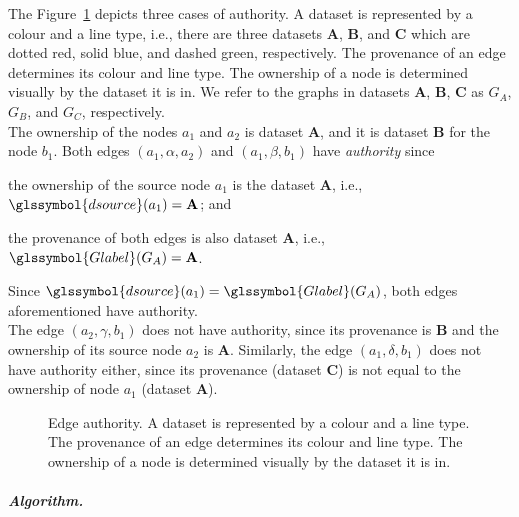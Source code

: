The Figure~\ref{fig:authority} depicts three cases of authority. A dataset is represented by a colour and a line type, i.e., there are three datasets {\bfseries A}, {\bfseries B}, and {\bfseries C} which are dotted red, solid blue, and dashed green, respectively. The provenance of an edge determines its colour and line type. The ownership of a node is determined visually by the dataset it is in. We refer to the graphs in datasets \textbf{A}, \textbf{B}, \textbf{C} as $G_A$, $G_B$, and $G_C$, respectively.\\

The ownership of the nodes $a_1$ and $a_2$ is dataset {\bfseries A}, and it is dataset {\bfseries B} for the node $b_1$. Both edges $(a_1, \alpha, a_2)$ and $\left(a_1, \beta, b_1 \right)$ have \emph{authority} since
\begin{inparaenum}[(1)]
	\item the ownership of the source node $a_1$ is the dataset {\bfseries A}, i.e., $\glssymbol{dsource}(a_1) = \textbf{A}$; and
	\item the provenance of both edges is also dataset {\bfseries A}, i.e., $\glssymbol{Glabel}(G_A) = \textbf{A}$.
\end{inparaenum}
Since $\glssymbol{dsource}(a_1) = \glssymbol{Glabel}(G_A)$, both edges aforementioned have authority.\\

The edge $\left(a_2, \gamma, b_1\right)$ does not have authority, since its provenance is {\bfseries B} and the ownership of its source node $a_2$ is {\bfseries A}. Similarly, the edge $\left(a_1,\delta,b_1\right)$ does not have authority either, since its provenance (dataset \textbf{C}) is not equal to the ownership of node $a_1$ (dataset \textbf{A}).

\begin{figure}
	\centering
	
	\caption[Edge authority]{Edge authority. A dataset is represented by a colour and a line type. The provenance of an edge determines its colour and line type. The ownership of a node is determined visually by the dataset it is in.}
	\label{fig:authority}
\end{figure}

\subparagraph{Algorithm.}


